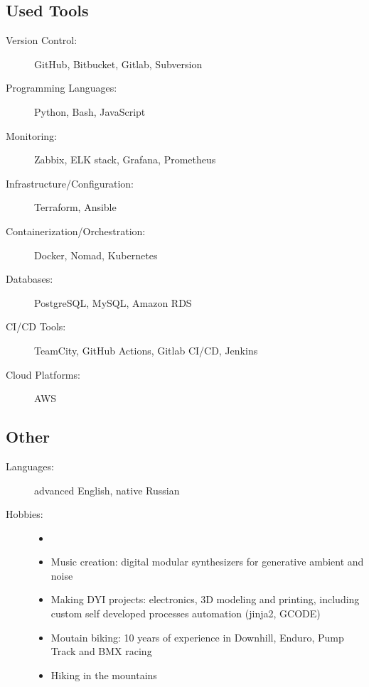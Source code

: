 \documentclass[10pt]{report}
\begin{document}
\subsection*{Used Tools}
\begin{description}
  \item[Version Control:]
        GitHub, Bitbucket, Gitlab, Subversion
  \item[Programming Languages:]
        Python, Bash, JavaScript
  \item[Monitoring:]
        Zabbix, ELK stack, Grafana, Prometheus
  \item[Infrastructure/Configuration:]
        Terraform, Ansible
  \item[Containerization/Orchestration:]
        Docker, Nomad, Kubernetes
  \item[Databases:]
        PostgreSQL, MySQL, Amazon RDS
  \item[CI/CD Tools:]
        TeamCity, GitHub Actions, Gitlab CI/CD, Jenkins
  \item[Cloud Platforms:]
        AWS
\end{description}

\subsection*{Other}
\begin{description}
  \item[Languages:]
        advanced English, native Russian
  \item[Hobbies:]
        \begin{itemize}
          \item[]
          \item Music creation: digital modular synthesizers for generative ambient and noise
          \item Making DYI projects: electronics, 3D modeling and printing, including custom self developed processes automation (jinja2, GCODE)
          \item Moutain biking: 10 years of experience in Downhill, Enduro, Pump Track and BMX racing
          \item Hiking in the mountains
        \end{itemize}

\end{description}
\end{document}
